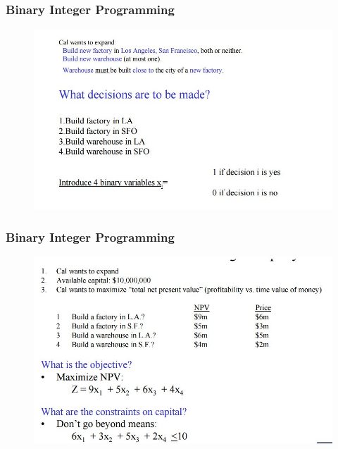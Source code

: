 \documentclass{beamer}
\begin{document}
\begin{frame}
	\frametitle{Binary Integer Programming}
	\large
	\begin{figure}
		\centering
		\includegraphics[width=1.1\linewidth]{calaircraft3}
	\end{figure}
\end{frame}
\begin{frame}
	\frametitle{Binary Integer Programming}
	\large
	\begin{figure}
		\centering
		\includegraphics[width=1.1\linewidth]{calaircraft4}
	\end{figure}
\end{frame}
\end{document}
